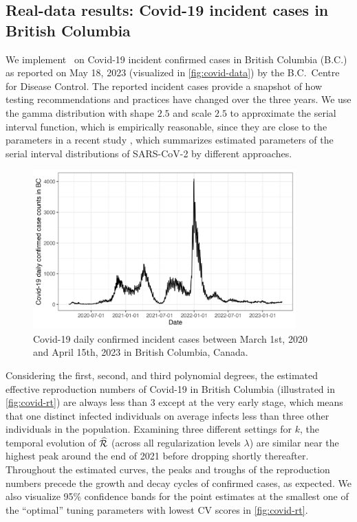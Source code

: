 \subsection{Real-data results: Covid-19 incident cases in British Columbia}

We implement \RtEstim\ on Covid-19 incident confirmed cases in British Columbia
(B.C.) as reported on May 18, 2023 (visualized in \autoref{fig:covid-data}) by
the B.C.\ Centre for Disease Control. The reported incident cases provide a
snapshot of how testing recommendations and practices have changed over the
three years. We use the gamma distribution with shape $2.5$ and scale $2.5$
to approximate the serial interval function, which is empirically
reasonable, since they are close to the parameters in a recent study 
\citep{lehtinen2021relationship}, which summarizes estimated parameters of the 
serial interval distributions of SARS-CoV-2 by different approaches. 

\begin{figure}[tb]
    \centering
    \includegraphics[width=0.9\textwidth]{fig/covid_dat.png}
    \caption{Covid-19 daily confirmed incident cases between March 1st, 
    2020 and April 15th, 2023 in British Columbia, Canada.} 
    \label{fig:covid-data}
\end{figure} 

Considering the first, second, and third polynomial degrees, the estimated 
effective reproduction numbers of Covid-19 in British Columbia
(illustrated in \autoref{fig:covid-rt}) are always less than $3$ except at the 
very early stage, which means that one distinct infected individuals on average 
infects less than three other individuals in the population. 
Examining three different settings for $k$, 
the temporal evolution of $\widehat{\mathcal{R}}$ (across all regularization levels
$\lambda$) are similar near the highest peak around the end of 2021 before
dropping shortly thereafter. Throughout the estimated curves, the peaks and
troughs of the reproduction numbers precede the growth and decay cycles of
confirmed cases, as expected. We also visualize 95\% confidence bands for the
point estimates at the smallest one of the ``optimal'' tuning parameters with 
lowest CV scores in \autoref{fig:covid-rt}.     

